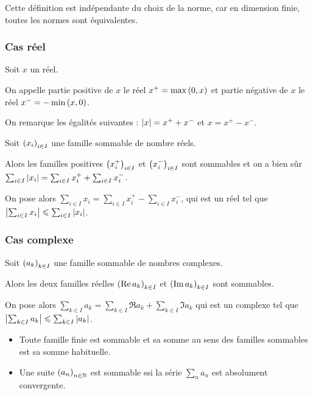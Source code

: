 Cette définition est indépendante du choix de la norme, car en dimension finie, toutes les normes sont équivalentes.

\subsubsection{Cas réel}

\begin{defi}
Soit \(x\) un réel.

On appelle partie positive de \(x\) le réel \(x^+=\max\left(0,x\right)\) et partie négative de \(x\) le réel \(x^-=-\min\left(x,0\right)\).
\end{defi}

On remarque les égalités suivantes : \(\left\lvert x\right\rvert=x^++x^-\) et \(x=x^+-x^-\).

\begin{prop}
Soit \(\left(x_i\right)_{i\in I}\) une famille sommable de nombre réels.

Alors les familles positives \(\left(x_i^+\right)_{i\in I}\) et \(\left(x_i^-\right)_{i\in I}\) sont sommables et on a bien sûr \(\sum_{i\in I}\left\lvert x_i\right\rvert=\sum_{i\in I}x_i^++\sum_{i\in I}x_i^-\).
\end{prop}

On pose alors \(\sum_{i\in I}x_i=\sum_{i\in I}x_i^+-\sum_{i\in I}x_i^-\), qui est un réel tel que \(\left\lvert\sum_{i\in I}x_i\right\rvert\leqslant\sum_{i\in I}\left\lvert x_i\right\rvert\).

\subsubsection{Cas complexe}

\begin{prop}
Soit \(\left(a_k\right)_{k\in I}\) une famille sommable de nombres complexes.

Alors les deux familles réelles \(\left(\operatorname{Re} a_k\right)_{k\in I}\) et \(\left(\operatorname{Im} a_k\right)_{k\in I}\) sont sommables.
\end{prop}

On pose alors \(\sum_{k\in I}a_k=\sum_{k\in I}\Re a_k+\sum_{k\in I}\Im a_k\) qui est un complexe tel que \(\left\lvert\sum_{k\in I}a_k\right\rvert\leqslant\sum_{k\in I}\left\lvert a_k\right\rvert\).

\begin{ex}
\begin{itemize}
    \item Toute famille finie est sommable et sa somme au sens des familles sommables est sa somme habituelle. \\
    \item Une suite \(\left(a_n\right)_{n\in\mathbb{N}}\) est sommable ssi la série \(\sum_na_n\) est absolument convergente.
\end{itemize}
\end{ex}

